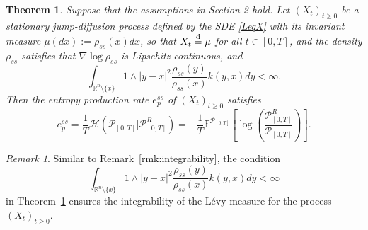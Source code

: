 \documentclass[10pt]{article}
\newtheorem{thm}{Theorem}[section]
\theoremstyle{definition}
\theoremstyle{remark}
\newtheorem{rem}{Remark}[section]
\numberwithin{equation}{section}
\begin{document}
\begin{thm}\label{eprpath}
Suppose that the assumptions in Section 2 hold.
Let $(X_t)_{t \geq 0}$ be a stationary jump-diffusion process defined by the SDE \eqref{LeqX} with its invariant measure $\mu(dx):=\rho_{ss}(x)dx$, so that $X_t \overset{\text d}{=} \mu$ for all $t \in [0,T]$, and the density $\rho_{ss}$ satisfies that $\nabla\log\rho_{ss}$ is Lipschitz continuous, and
\begin{equation*}
    \int_{\mathbb{R}^n \setminus\{x\}} 1 \wedge |y-x|^2 \frac{\rho_{ss}(y)}{\rho_{ss}(x)} k(y,x) dy < \infty. 
\end{equation*}
Then the entropy production rate $e_{p}^{ss}$ of  $(X_t)_{t \geq 0}$ satisfies
\begin{equation*}
    e^{ss}_p=\frac{1}{T}\mathcal{H}(\mathcal{P}_{[0,T]} | \mathcal{P}^R_{[0,T]}) = -\frac{1}{T}\mathbb{E}^{\mathcal{P}_{[0,T]}} \left[ \log \left(\frac{\mathcal{P}^R_{[0,T]}}{\mathcal{P}_{[0,T]}}\right) \right].
\end{equation*}
\end{thm}
\begin{rem}
    Similar to Remark~\ref{rmk:integrability}, the condition 
    \begin{equation*}
    \int_{\mathbb{R}^n \setminus\{x\}} 1 \wedge |y-x|^2 \frac{\rho_{ss}(y)}{\rho_{ss}(x)} k(y,x) dy < \infty
\end{equation*}
in Theorem~\ref{eprpath} ensures the integrability of the L\'evy measure for the process $(X_t)_{t \geq 0}$.
\end{rem}
\end{document}
